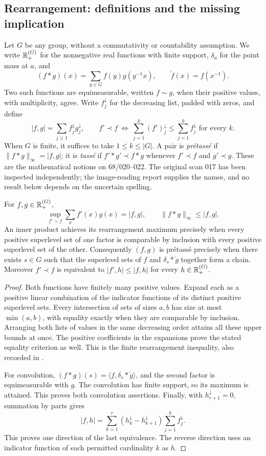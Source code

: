 \subsection{Rearrangement: definitions and the missing implication}
Let $G$ be any group, without a commutativity or countability assumption.
We write ${\mathbb{R}}^{(G)}_+$ for the nonnegative real functions with finite support,
$\delta_a$ for the point mass at $a$, and
\[
 (f*g)(x)=\sum_{y\in G}f(y)g(y^{-1}x),\qquad
 \check f(x)=f(x^{-1}).
\]
Two such functions are equimeasurable, written $f\sim g$, when their
positive values, with multiplicity, agree. Write $f^\downarrow_j$ for the
decreasing list, padded with zeros, and define
\[
 |f,g|=\sum_{j\geq1}f^\downarrow_jg^\downarrow_j,
 \qquad f'\prec f\ \Longleftrightarrow\
 \sum_{j=1}^k(f')^\downarrow_j\leq\sum_{j=1}^kf^\downarrow_j
 \text{ for every }k.
\]
When $G$ is finite, it suffices to take $1\leq k\leq|G|$.
A pair is \emph{pr\'etass\'e} if $\|f*g\|_\infty=|f,g|$; it is
\emph{tass\'e} if $f'*g'\prec f*g$ whenever $f'\prec f$ and $g'\prec g$.
These are the mathematical notions on 68/020--022. The original scan 017
has been inspected independently; the image-reading report supplies the
names, and no result below depends on the uncertain spelling.

\begin{lemma}\label{C-rearrangement}
For $f,g\in{\ensuremath{\mathbb{R}}}^{(G)}_+$,
\[
 \sup_{f'\sim f}\sum_x f'(x)g(x)=|f,g|,
 \qquad \|f*g\|_\infty\leq|f,g|.
\]
An inner product achieves its rearrangement maximum precisely when every
positive superlevel set of one factor is comparable by inclusion with
every positive superlevel set of the other. Consequently $(f,g)$ is
pr\'etass\'e precisely when there exists $s\in G$ such that the superlevel
sets of $f$ and $\delta_s*\check g$ together form a chain.
Moreover $f'\prec f$ is equivalent to $|f',h|\leq|f,h|$ for every
$h\in{\ensuremath{\mathbb{R}}}^{(G)}_+$.
\end{lemma}
\begin{proof}
Both functions have finitely many positive values. Expand each as a
positive linear combination of the indicator functions of its distinct
positive superlevel sets. Every intersection of sets of sizes $a,b$ has
size at most $\min(a,b)$, with equality exactly when they are comparable
by inclusion. Arranging both lists of values in the same decreasing
order attains all these upper bounds at once. The positive coefficients
in the expansions prove the stated equality criterion as well. This is
the finite rearrangement inequality, also recorded in
\cite[Chapter X, \S10.2, Theorem 368]{HLP}.

For convolution,
$(f*g)(s)=\langle f,\delta_s*\check g\rangle$, and the second factor is
equimeasurable with $g$. The convolution has finite support, so its
maximum is attained. This proves both convolution assertions.
Finally, with $h^\downarrow_{r+1}=0$, summation by parts gives
\[
 |f,h|=\sum_{k=1}^{r}
   (h^\downarrow_k-h^\downarrow_{k+1})
   \sum_{j=1}^kf^\downarrow_j.
\]
This proves one direction of the last equivalence. The reverse direction
uses an indicator function of each permitted cardinality $k$ as $h$.
\end{proof}


